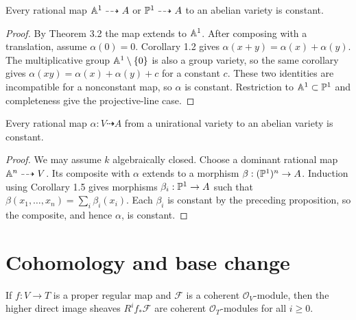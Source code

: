 \begin{proposition}
\label{prop:milne-no-rational-curves}

Every rational map $\mathbb{A}^1\dashrightarrow A$ or $\mathbb{P}^1\dashrightarrow A$ to an
abelian variety is constant.
\end{proposition}

\begin{proof}
By Theorem 3.2 the map extends to $\mathbb{A}^1$.  After composing with a translation,
assume $\alpha(0)=0$.  Corollary 1.2 gives
$\alpha(x+y)=\alpha(x)+\alpha(y)$.  The multiplicative group
$\mathbb{A}^1\setminus\{0\}$ is also a group variety, so the same corollary gives
$\alpha(xy)=\alpha(x)+\alpha(y)+c$ for a constant $c$.  These two identities
are incompatible for a nonconstant map, so $\alpha$ is constant.  Restriction
to $\mathbb{A}^1\subset\mathbb{P}^1$ and completeness give the projective-line case.
\end{proof}

\begin{proposition}
\label{prop:milne-unirational-to-abelian}

Every rational map $\alpha:V\dashrightarrow A$ from a unirational variety to
an abelian variety is constant.
\end{proposition}

\begin{proof}
We may assume $k$ algebraically closed.  Choose a dominant rational map
$\mathbb{A}^n\dashrightarrow V$.  Its composite with $\alpha$ extends to a morphism
$\beta:(\mathbb{P}^1)^n\to A$.  Induction using Corollary 1.5 gives morphisms
$\beta_i:\mathbb{P}^1\to A$ such that
$\beta(x_1,\ldots,x_n)=\sum_i\beta_i(x_i)$.  Each $\beta_i$ is constant by
the preceding proposition, so the composite, and hence $\alpha$, is constant.
\end{proof}

\section{Cohomology and base change}

\begin{theorem}
\label{thm:milne-cohomology-coherence}

If $f:V\to T$ is a proper regular map and $\mathcal F$ is a coherent
$\mathcal O_V$-module, then the higher direct image sheaves
$R^if_*\mathcal F$ are coherent $\mathcal O_T$-modules for all $i\ge0$.
\end{theorem}

